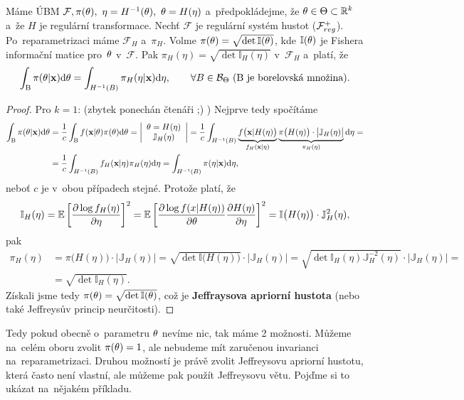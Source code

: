 \begin{theorem}[Jeffreys]
	Máme ÚBM $\mathcal{F},\pi(\theta),~\eta=H^{-1}(\theta),~\theta=H(\eta)$ a~předpokládejme, že $\theta\in\Theta\subset\mathbb{R}^k$ a~že $H$ je regulární transformace. Nechť $\mathcal{F}$ je regulární systém hustot ($\mathcal{F}_{reg}^+$). Po~reparametrizaci máme $\mathcal{F}_H$ a~$\pi_H$. Volme $\pi(\theta)=\sqrt{\det \mathbb{I}(\theta)}$, kde $\mathbb{I}(\theta)$ je Fishera informační matice pro~$\theta$ v~$\mathcal{F}$. Pak $\pi_H(\eta)=\sqrt{\det \mathbb{I}_H(\eta)}$ v~$\mathcal{F}_H$ a~platí, že 
	$$ \int_\mathrm{B}\pi(\theta|\textbf{x})\mathrm{d}\theta=\int_{H^{-1}(B)}\pi_H(\eta|\textbf{x})\mathrm{d}\eta,\qquad\forall B\in\mathcal{B}_\Theta \text{ (B je borelovská množina).}$$
	\begin{proof}
		Pro $k=1$: (zbytek ponechán čtenáři ;) ) Nejprve tedy spočítáme
		\[
			\begin{split}
			\int_\mathrm{B}\pi(\theta|\textbf{x})\mathrm{d}\theta&=\frac{1}{c}\int_\mathrm{B} f(\textbf{x}|\theta)\pi(\theta)\mathrm{d}\theta=\left|\begin{array}{c}
			\theta=H(\eta)\\\mathbb{J}_H(\eta)
			\end{array}
			\right|=\frac{1}{c}\int_{H^{-1}(B)}\underbrace{f\big(\textbf{x}|H(\eta)\big)}_{f_H(\textbf{x}|\eta)}\underbrace{\pi\big(H(\eta)\big)\cdot\big|\mathbb{J}_H(\eta)\big|}_{\pi_H(\eta)}\mathrm{d}\eta=\\&=\frac{1}{c}\int_{H^{-1}(B)}f_H(\textbf{x}|\eta)\pi_H(\eta)\mathrm{d}\eta=\int_{H^{-1}(B)}\pi(\eta|\textbf{x})\mathrm{d}\eta,
			\end{split}
			\]
		neboť $c$ je v~obou případech stejné. Protože platí, že
			$$ \mathbb{I}_H(\eta)=\mathbb{E}\left[ \frac{\partial\log f_H(\eta)}{\partial\eta} \right]^2=\mathbb{E}\left[ \frac{\partial\log f(x|H(\eta))}{\partial\theta}\frac{\partial H(\eta)}{\partial\eta} \right]^2=\mathbb{I}\big(H(\eta)\big) \cdot \mathbb{J}_H^2(\eta) ,$$
			pak \[
			\begin{split}
			\pi_H(\eta)&=\pi\big(H(\eta)\big)\cdot\big|\mathbb{J}_H(\eta)\big|=\sqrt{\det \mathbb{I}\big(H(\eta)\big)}\cdot\big|\mathbb{J}_H(\eta)\big|=\sqrt{\det \mathbb{I}_H(\eta)\mathbb{J}_H^{-2}(\eta)}\cdot\big|\mathbb{J}_H(\eta)\big|=\\&=\sqrt{\det \mathbb{I}_H(\eta)}.
			\end{split}
			\]
			Získali jsme tedy $\pi(\theta)=\sqrt{\det \mathbb{I}(\theta)}$, což je \textbf{Jeffraysova apriorní hustota} (nebo také Jeffreysův princip neurčitosti).
	\end{proof}
\end{theorem}
Tedy pokud obecně o~parametru $\theta$ nevíme nic, tak máme 2 možnosti. Můžeme na~celém oboru zvolit $\pi(\theta)=1$, ale nebudeme mít zaručenou invarianci na~reparametrizaci. Druhou možností je právě zvolit Jeffreysovu apriorní hustotu, která často není vlastní, ale můžeme pak použít Jeffreysovu větu. Pojďme si to ukázat na~nějakém příkladu.
